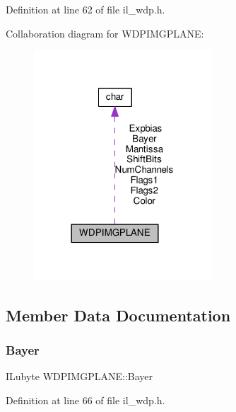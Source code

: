 Definition at line 62 of file il\+\_\+wdp.\+h.



Collaboration diagram for W\+D\+P\+I\+M\+G\+P\+L\+A\+NE\+:
\nopagebreak
\begin{figure}[H]
\begin{center}
\leavevmode
\includegraphics[width=189pt]{d7/d34/structWDPIMGPLANE__coll__graph}
\end{center}
\end{figure}


\subsection{Member Data Documentation}
\mbox{\label{structWDPIMGPLANE_af7bff88d0972677b2824f04ace38696f}} 
\subsubsection{\texorpdfstring{Bayer}{Bayer}}
{\footnotesize\ttfamily I\+Lubyte W\+D\+P\+I\+M\+G\+P\+L\+A\+N\+E\+::\+Bayer}



Definition at line 66 of file il\+\_\+wdp.\+h.

\mbox{\label{structWDPIMGPLANE_a4f0eed93939122bceea8b28e50fa0fa4}} 
